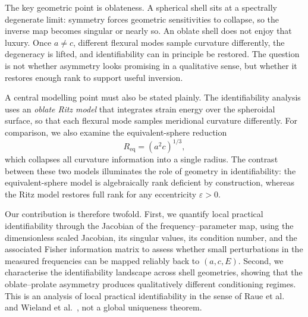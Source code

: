 The key geometric point is oblateness.  A spherical shell sits at a spectrally
degenerate limit: symmetry forces geometric sensitivities to collapse, so the
inverse map becomes singular or nearly so.  An oblate shell does not enjoy that
luxury.  Once $a \neq c$, different flexural modes sample curvature differently,
the degeneracy is lifted, and identifiability can in principle be restored.
The question is not whether asymmetry looks promising in a qualitative sense,
but whether it restores enough rank to support useful inversion.

A central modelling point must also be stated plainly.  The identifiability
analysis uses an \emph{oblate Ritz model} that integrates strain energy over
the spheroidal surface, so that each flexural mode samples meridional curvature
differently.  For comparison, we also examine the equivalent-sphere reduction
\begin{equation}
  R_\mathrm{eq} = (a^2 c)^{1/3},
\end{equation}
which collapses all curvature information into a single radius.  The
contrast between these two models illuminates the role of geometry in
identifiability: the equivalent-sphere model is algebraically rank deficient
by construction, whereas the Ritz model restores full rank for any
eccentricity $\varepsilon>0$.

Our contribution is therefore twofold.  First, we quantify local practical
identifiability through the Jacobian of the frequency--parameter map, using the
dimensionless scaled Jacobian, its singular values, its condition number, and
the associated Fisher information matrix to assess whether small perturbations
in the measured frequencies can be mapped reliably back to $(a,c,E)$.  Second,
we characterise the identifiability landscape across shell geometries, showing
that the oblate--prolate asymmetry produces qualitatively different
conditioning regimes.  This is an analysis of local practical
identifiability in the sense of Raue et al.~\cite{Raue2009} and Wieland et
al.~\cite{Wieland2021}, not a global uniqueness theorem.

